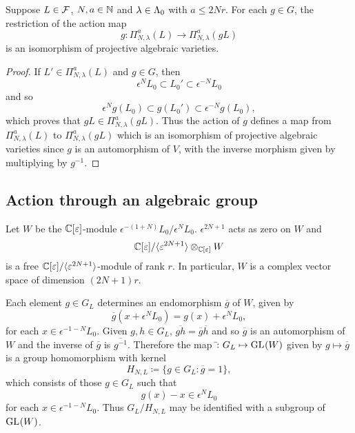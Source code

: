\documentclass[a4paper, 11pt, twoside]{report}
\begin{document}
\begin{lemma}
Suppose $L\in\mathcal{F}$, $N,a \in\mathbb{N}$ and $\lambda\in\Lambda_0{}$ with $a\le 2Nr$. For each $g\in G$, the restriction of the action map
\begin{equation*}
g\colon\Pi_{N,\lambda}^a(L)\to \Pi_{N,\lambda}^a(gL)
\end{equation*}
is an isomorphism of projective algebraic varieties.
\end{lemma}

\begin{proof}
If $L'\in\Pi_{N,\lambda}^a(L)$ and $g\in G$, then
\begin{equation*}
\epsilon^N L_0\subset L_0'\subset \epsilon^{-N}L_0
\end{equation*}
and so
\begin{equation*}
\epsilon^N g(L_0)\subset g(L_0')\subset \epsilon^{-N}g(L_0),
\end{equation*}
which proves that $gL\in\Pi_{N,\lambda}^a(gL)$. Thus the action of $g$ defines a map from $\Pi_{N,\lambda}^a(L)$ to $\Pi_{N,\lambda}^a(gL)$ which is an isomorphism of projective algebraic varieties since $g$ is an automorphism of $V$, with the inverse morphism given by multiplying by $g^{-1}$.
\end{proof}

\subsection{Action through an algebraic group}

Let $W$ be the $\mathbb{C}[\varepsilon]$-module $\epsilon^{-(1+N)}L_0/{\epsilon^{N}L_0}$. $\epsilon^{2N+1}$ acts as zero on $W$ and
\begin{equation*}
\mathbb{C}[\varepsilon]/{\langle\varepsilon^{2N+1}\rangle}\otimes_{\mathbb{C}[\varepsilon]}W
\end{equation*}
is a free $\mathbb{C}[\varepsilon]/{\langle\varepsilon^{2N+1}\rangle}$-module of rank $r$. In particular, $W$ is a complex vector space of dimension $(2N+1)r$.

Each element $g\in G_L$ determines an endomorphism $\overline{g}$ of $W$, given by
\begin{equation*}
\overline{g}(x+\epsilon^N L_0) = g(x) + \epsilon^N L_0,
\end{equation*}
for each $x\in\epsilon^{-1-N}L_0$. Given $g,h\in G_L$, $\overline{gh}=\overline{g}\overline{h}$ and so $\overline{g}$ is an automorphism of $W$ and the inverse of $\overline{g}$ is $\overline{g^{-1}}$. Therefore the map $\bar{}\colon G_L\mapsto\operatorname{GL}_{}(W)$ given by $g\mapsto \overline{g}$ is a group homomorphism with kernel
\begin{equation*}
H_{N,L}\coloneqq \{g\in G_L:\overline{g}=1\},
\end{equation*}
which consists of those $g\in G_L$ such that
\begin{equation*}
g(x) - x\in \epsilon^N L_0
\end{equation*}
for each $x\in\epsilon^{-1-N}L_0$. Thus $G_L/{H_{N,L}}$ may be identified with a subgroup of $\operatorname{GL}_{}(W)$.
\end{document}
